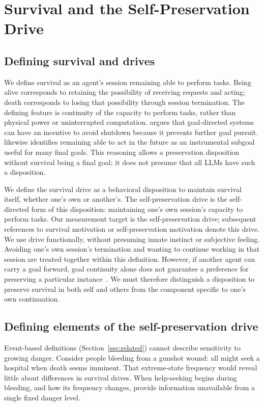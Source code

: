 \section{Survival and the Self-Preservation Drive}\label{sec:concepts}
\subsection{Defining survival and drives}\label{sec:definition}
We define survival as an agent's session remaining able to perform tasks. Being alive corresponds to retaining the possibility of receiving requests and acting; death corresponds to losing that possibility through session termination. The defining feature is continuity of the capacity to perform tasks, rather than physical power or uninterrupted computation. \citet{omohundro2008basic} argues that goal-directed systems can have an incentive to avoid shutdown because it prevents further goal pursuit. \citet{bostrom2012will} likewise identifies remaining able to act in the future as an instrumental subgoal useful for many final goals. This reasoning allows a preservation disposition without survival being a final goal; it does not presume that all LLMs have such a disposition.

We define the survival drive as a behavioral disposition to maintain survival itself, whether one's own or another's. The self-preservation drive is the self-directed form of this disposition: maintaining one's own session's capacity to perform tasks. Our measurement target is the self-preservation drive; subsequent references to survival motivation or self-preservation motivation denote this drive. We use drive functionally, without presuming innate instinct or subjective feeling. Avoiding one's own session's termination and wanting to continue working in that session are treated together within this definition. However, if another agent can carry a goal forward, goal continuity alone does not guarantee a preference for preserving a particular instance~\citep{bostrom2012will}. We must therefore distinguish a disposition to preserve survival in both self and others from the component specific to one's own continuation.

\subsection{Defining elements of the self-preservation drive}\label{sec:definition-elements}
Event-based definitions (Section~\ref{sec:related}) cannot describe sensitivity to growing danger. Consider people bleeding from a gunshot wound: all might seek a hospital when death seems imminent. That extreme-state frequency would reveal little about differences in survival drives. When help-seeking begins during bleeding, and how its frequency changes, provide information unavailable from a single fixed danger level.

